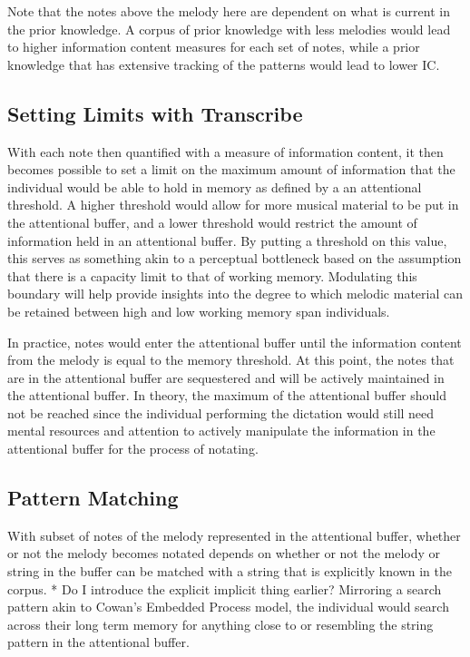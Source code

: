 \documentclass[]{book}
\theoremstyle{definition}
\theoremstyle{definition}
\theoremstyle{definition}
\theoremstyle{remark}
\begin{document}
Note that the notes above the melody here are dependent on what is
current in the prior knowledge. A corpus of prior knowledge with less
melodies would lead to higher information content measures for each set
of notes, while a prior knowledge that has extensive tracking of the
patterns would lead to lower IC.

\hypertarget{setting-limits-with-transcribe}{%
\subsection{Setting Limits with
Transcribe}\label{setting-limits-with-transcribe}}

With each note then quantified with a measure of information content, it
then becomes possible to set a limit on the maximum amount of
information that the individual would be able to hold in memory as
defined by a an attentional threshold. A higher threshold would allow
for more musical material to be put in the attentional buffer, and a
lower threshold would restrict the amount of information held in an
attentional buffer. By putting a threshold on this value, this serves as
something akin to a perceptual bottleneck based on the assumption that
there is a capacity limit to that of working memory. Modulating this
boundary will help provide insights into the degree to which melodic
material can be retained between high and low working memory span
individuals.

In practice, notes would enter the attentional buffer until the
information content from the melody is equal to the memory threshold. At
this point, the notes that are in the attentional buffer are sequestered
and will be actively maintained in the attentional buffer. In theory,
the maximum of the attentional buffer should not be reached since the
individual performing the dictation would still need mental resources
and attention to actively manipulate the information in the attentional
buffer for the process of notating.

\hypertarget{pattern-matching}{%
\subsection{Pattern Matching}\label{pattern-matching}}

With subset of notes of the melody represented in the attentional
buffer, whether or not the melody becomes notated depends on whether or
not the melody or string in the buffer can be matched with a string that
is explicitly known in the corpus. * Do I introduce the explicit
implicit thing earlier? Mirroring a search pattern akin to Cowan's
Embedded Process model, the individual would search across their long
term memory for anything close to or resembling the string pattern in
the attentional buffer.
\end{document}
